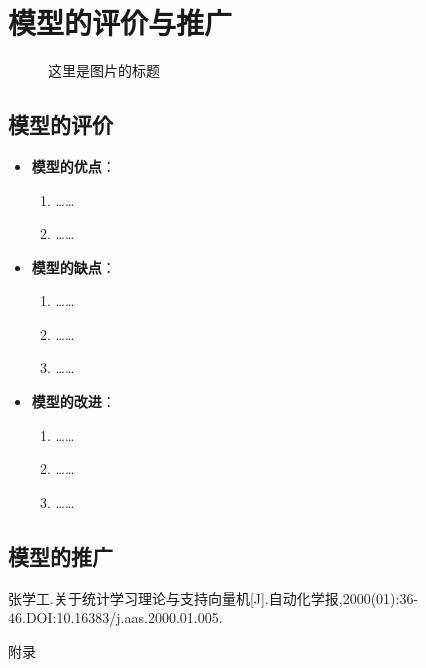 \documentclass{MathorCupModeling}
\begin{document}
	\section{模型的评价与推广}
	\begin{figure}[H]
		\caption{这里是图片的标题}\label{fig:picturename3}
	\end{figure}
	\subsection{模型的评价}
	\begin{itemize}
		\item \textbf{模型的优点}：
			\begin{enumerate}
				\item ……
				\item ……
			\end{enumerate}
		\item \textbf{模型的缺点}：
			\begin{enumerate}
				\item ……
				\item ……
				\item ……
			\end{enumerate}
		\item \textbf{模型的改进}：
			\begin{enumerate}
				\item ……
				\item ……
				\item ……
			\end{enumerate}
	\end{itemize}
	\subsection{模型的推广}

	\newpage
	\begin{thebibliography}{99}
	张学工.关于统计学习理论与支持向量机[J].自动化学报,2000(01):36-46.DOI:10.16383/j.aas.2000.01.005.
	
	\end{thebibliography}

	\newpage


	\begin{center}
		\heiti{} 附\hspace{2pc}录
	\end{center}
\end{document}
